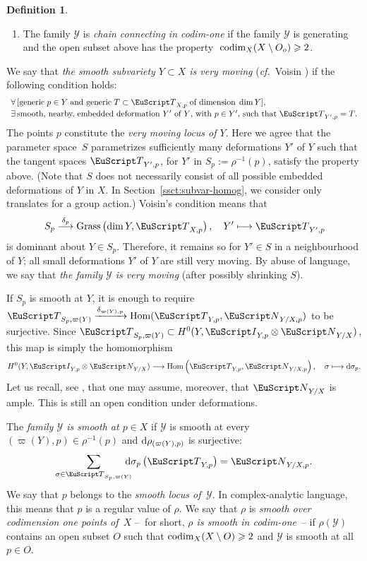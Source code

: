 \documentclass[10pt,a4paper]{article}
\numberwithin{equation}{section}
\theoremstyle{definition}
\newtheorem{m-definition}[m-theorem]{Definition}
\theoremstyle{remark}
\let\euf\EuScript %
\let\cal\mathcal
\let\dta\delta
\let\ges\geqslant
\let\sm\setminus
\let\srel\stackrel
\let\disp\displaystyle
\newcommand{\codim}{\mathop{\rm codim}\nolimits}
\renewcommand{\dim}{\mathop{\rm dim}\nolimits}
\newcommand{\eI}{{\euf I}}
\newcommand{\rd}{{\rm d}}
\newcommand{\eN}{{\euf N}}
\newcommand{\eT}{{\euf T}}
\newcommand{\cY}{{\cal Y}}
\newcommand{\XX}{X}
\newcommand{\YY}{Y}
\newcommand\Hom{\mathop{\rm Hom}\nolimits}
\DeclareMathOperator{\Grass}{Grass}
\newcommand{\lra}{\longrightarrow}
\begin{document}
\begin{m-definition}
\begin{aenum}
\begin{enumerate}
\item\label{d:YY-g-b4} The family $\cY$ is \emph{chain connecting in codim-one} if the family $\cY$ is generating and the open subset above has the property $\;\codim_\XX(\XX\sm O_o)\ges2$.
\end{enumerate}

\item \label{d:YY-g-c}
We say that \emph{the smooth subvariety $Y\subset X$ is very moving} (\textit{cf.}~Voisin \cite[Definition 0.5]{voisin-coniv}) if the following condition holds:
\[
\begin{array}{l}
\forall\,[\text{generic}\;p\in\YY\;\text{and generic}\;T\subset\eT_{\XX,p}\;\text{of dimension}\;\dim\YY],\\[.5ex] 
\exists\,\text{smooth, nearby, embedded deformation $\YY'$ of $\YY$, with $p\in\YY'$, such that $\eT_{\YY',p}=T$.}
\end{array}
\]
The points $p$ constitute the \emph{very moving locus of $\YY$}.  Here we agree that the parameter space~$S$ parametrizes sufficiently many deformations $\YY'$ of $\YY$ such that the tangent spaces $\eT_{\YY', p}$, for $\YY'$ in $S_p:=\rho^{-1}(p)$, satisfy the property above. (Note that $S$ does not necessarily consist of all possible embedded deformations of $\YY$ in $\XX$. In Section~\ref{ssct:subvar-homog}, we consider only translates for a group action.) 
Voisin's condition means that 
\[
\,S_p\srel{\dta_p}{\lra} \Grass\left(\dim\YY,\eT_{\XX,p}\right),\quad \YY'\longmapsto \eT_{\YY',p} 
\]
is dominant about $\YY\in S_p$. Therefore, it remains so for $\YY'\in S$ in a neighbourhood of $\YY$; all small deformations $\YY'$ of $\YY$ are still very moving. By abuse of language, we say that \emph{the family $\cY$ is very moving} (after possibly shrinking $S$).

If $S_p$ is smooth at $\YY$, it is enough to require  $\eT_{S_p,\varpi(\YY)}\xrightarrow{\dta_{\varpi(\YY),p}}\Hom(\eT_{\YY,p},\eN_{\YY/\XX,p})$ to be surjective. Since $\eT_{S_p,\varpi(\YY)}\subset H^0(\YY,\eI_{\YY,p}\otimes\eN_{\YY/\XX})$, this map is simply the homomorphism
\[
H^0(\YY,\eI_{\YY,p}\otimes\eN_{\YY/\XX})\lra \Hom\left(\eT_{\YY,p},\eN_{\YY/\XX,p}\right),\quad \sigma\longmapsto\rd\sigma_p.
\]
Let us recall, see \cite[Remark 2.6]{voisin-coniv}, that one may assume, moreover, that $\eN_{\YY/\XX}$ is ample. This is still an open condition under deformations.

\item\label{d:YY-g-d}
The \emph{family $\cY$ is smooth at $p\in\XX$} if $\cY$ is smooth at every $(\varpi(\YY),p)\in\rho^{-1}(p)$ and $\rd\rho_{(\varpi(\YY),p)}$ is surjective: 
\[
\disp\sum_{\sigma\in\eT_{S_p,\varpi(\YY)}}\kern-2ex\rd\sigma_p\left(\eT_{\YY,p}\right)=\eN_{\YY/\XX,p}.
\]
We say that $p$ belongs to the \emph{smooth locus of\, $\cY$}. In complex-analytic language, this means that $p$ is a regular value of $\rho$. We say that $\rho$ is {\em smooth over codimension one points of\, $\XX$} --~for short, \emph{$\rho$ is smooth in codim-one}~-- if $\rho(\cY)$ contains an open subset $O$ such that $\codim_\XX(\XX\sm O)\ges2$ and $\cY$ is smooth at all $p\in O$. 


\end{aenum}
\end{m-definition}
\end{document}
